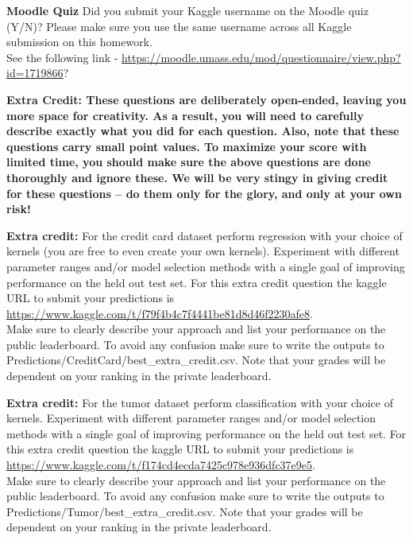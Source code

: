 \documentclass[11pt]{article}
\begin{document}
\begin{problem}{25}
\begin{description}
\end{description}
\end{problem}

\begin{problem}{0}\textbf{Moodle Quiz}
	Did you submit your Kaggle username on the Moodle quiz (Y/N)?  Please make sure you use the same username across all Kaggle submission on this homework.\\
	See the following link -  \url{https://moodle.umass.edu/mod/questionnaire/view.php?id=1719866}?
\end{problem}
\vspace{3mm}

\textbf{Extra Credit: These questions are deliberately open-ended, leaving you more space for creativity.
As a result, you will need to carefully describe exactly what you did for each question.
Also, note that these questions carry small point values. To maximize your score with limited time, you should make sure the above questions are done thoroughly and ignore these. We will be very stingy in giving credit for these questions -- do them only for the glory, and only at your own risk!}

\begin{problem}{5} \textbf{Extra credit:} For the credit card dataset perform regression with your choice of kernels (you are free to even create your own kernels). Experiment with different parameter ranges and/or model selection methods with a single goal of improving performance on the held out test set. For this extra credit question the kaggle URL to submit your predictions is\\
\url{https://www.kaggle.com/t/f79f4b4c7f4441be81d8d46f2230afe8}.\\
Make sure to clearly describe your approach and list your performance on the public leaderboard. To avoid any confusion make sure to write the outputs to Predictions/CreditCard/best\_extra\_credit.csv. Note that your grades will be dependent on your ranking in the private leaderboard.
\end{problem}

\begin{problem}{5} \textbf{Extra credit:} For the tumor dataset perform classification with your choice of kernels. Experiment with different parameter ranges and/or model selection methods with a single goal of improving performance on the held out test set. For this extra credit question the kaggle URL to submit your predictions is\\
\url{https://www.kaggle.com/t/f174cd4ecda7425c978e936dfc37e9e5}.\\
Make sure to clearly describe your approach and list your performance on the public leaderboard. To avoid any confusion make sure to write the outputs to Predictions/Tumor/best\_extra\_credit.csv. Note that your grades will be dependent on your ranking in the private leaderboard.
\end{problem}



\showpoints
\end{document}
